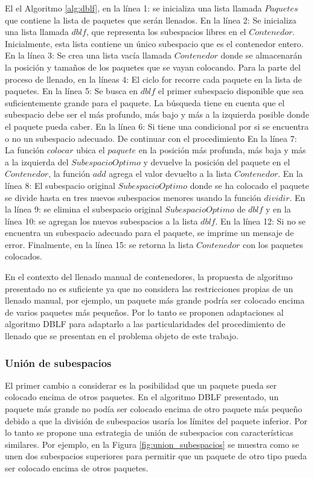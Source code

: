 \documentclass[openany]{article}
\begin{document}
El el Algoritmo \ref{alg:dblf}, en la línea 1: se inicializa una lista llamada $Paquetes$ que contiene la lista de paquetes que serán llenados. En la línea 2: Se inicializa una lista llamada $dblf$, que representa los subespacios libres en el $Contenedor$. Inicialmente, esta lista contiene un único subespacio que es el contenedor entero. En la línea 3: Se crea una lista vacía llamada $Contenedor$ donde se almacenarán la posición y tamaños de los paquetes que se vayan colocando. Para la parte del proceso de llenado, en la líneas 4: El ciclo for recorre cada paquete en la lista de paquetes. En la línea 5: Se busca en $dblf$ el primer subespacio disponible que sea suficientemente grande para el paquete. La búsqueda tiene en cuenta que el subespacio debe ser el más profundo, más bajo y más a la izquierda posible donde el paquete pueda caber. En la línea 6: Si tiene una condicional por si se encuentra o no un subespacio adecuado. De continuar con el procedimiento En la línea 7: La función $colocar$ ubica el $paquete$ en la posición más profunda, más baja y más a la izquierda del $SubespacioOptimo$ y devuelve la posición del paquete en el $Contenedor$, la función $add$ agrega el valor devuelto a la lista $Contenedor$. En la línea 8: El subespacio original $SubespacioOptimo$ donde se ha colocado el paquete se divide hasta en tres nuevos subespacios menores usando la función $dividir$. En la línea 9: se elimina el subespacio original $SubespacioOptimo$ de $dblf$ y en la línea 10: se agregan los nuevos subespacios a la lista $dblf$. En la línea 12: Si no se encuentra un subespacio adecuado para el paquete, se imprime un mensaje de error. Finalmente, en la línea 15: se retorna la lista $Contenedor$ con los paquetes colocados.

En el contexto del llenado manual de contenedores, la propuesta de algoritmo presentado no es suficiente ya que no considera las restricciones propias de un llenado manual, por ejemplo, un paquete más grande podría ser colocado encima de varios paquetes más pequeños. Por lo tanto se proponen adaptaciones al algoritmo DBLF para adaptarlo a las particularidades del procedimiento de llenado que se presentan en el problema objeto de este trabajo.

\subsubsection{Unión de subespacios}

El primer cambio a considerar es la posibilidad que un paquete pueda ser colocado encima de otros paquetes. En el algoritmo DBLF presentado, un paquete más grande no podía ser colocado encima de otro paquete más pequeño debido a que la división de subespacios usaría los límites del paquete inferior. Por lo tanto se propone una estrategia de unión de subespacios con características similares. Por ejemplo, en la Figura \ref{fig:union_subespacios} se muestra como se unen dos subespacios superiores para permitir que un paquete de otro tipo pueda ser colocado encima de otros paquetes.
\end{document}
